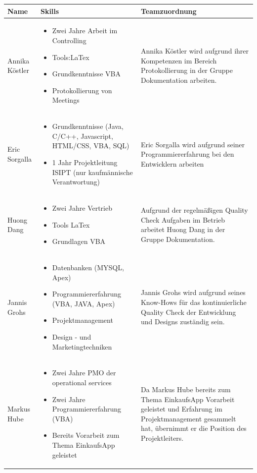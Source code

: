 \documentclass[12pt,a4paper]{article}
\begin{document}
\begin{tabular}{|m{5cm}|m{5cm}|m{5cm}|}
\hline
\textbf {Name} & \textbf {Skills} & \textbf {Teamzuordnung} \\
\hline
\centering Annika Köstler & \begin {itemize}
\item Zwei Jahre Arbeit im Controlling
\item Tools:LaTex
\item Grundkenntnisse VBA
\item Protokollierung von Meetings
\end{itemize}
& Annika Köstler wird aufgrund ihrer Kompetenzen im Bereich Protokollierung in der Gruppe Dokumentation arbeiten.
\\
\hline
\centering Eric Sorgalla & 
\begin {itemize}
\item Grundkenntnisse (Java, C/C++, Javascript, HTML/CSS, VBA, SQL)
\item 1 Jahr Projektleitung ISIPT (nur kaufmännische Verantwortung) 
\end {itemize}
& Eric Sorgalla wird aufgrund seiner Programmiererfahrung bei den Entwicklern arbeiten

\\
\hline
\centering Huong Dang & \begin {itemize}
\item Zwei Jahre Vertrieb
\item Tools LaTex
\item Grundlagen VBA 
\end {itemize}
& Aufgrund der regelmäßigen Quality Check Aufgaben im Betrieb arbeitet Huong Dang in der Gruppe Dokumentation.

\\
\hline
\centering Jannis Grohs & \begin {itemize}
\item Datenbanken (MYSQL, Apex)
\item Programmiererfahrung (VBA, JAVA, Apex)
\item Projektmanagement 
\item Design - und Marketingtechniken
\end {itemize}
& Jannis Grohs wird aufgrund seines Know-Hows für das kontinuierliche Quality Check der Entwicklung und Designs zuständig sein.

\\
\hline
\centering Markus Hube & \begin {itemize}
\item Zwei Jahre PMO der operational services
\item Zwei Jahre Programmiererfahrung (VBA)
\item Bereits Vorarbeit zum Thema EinkaufsApp geleistet 
\end {itemize}
& Da Markus Hube bereits zum Thema EinkaufsApp Vorarbeit geleistet und Erfahrung im Projektmanagement gesammelt hat, übernimmt er die Position des Projektleiters.


\end{tabular}
\end{document}
